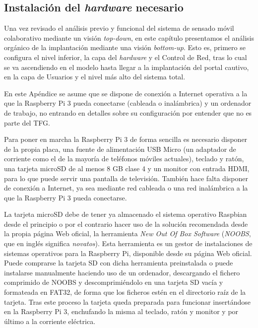 \appendixtitleon
\appendixtitletocon
\begin{appendices}
{}%
\begin{center}
\begin{minipage}{.75\textwidth}
\section{Instalación del \emph{hardware} necesario}\label{ApendiceA}


Una vez revisado el análisis previo y funcional del sistema de sensado móvil colaborativo mediante un visión \emph{top-down}, en este capítulo presentamos  el análisis orgánico de la implantación mediante una visión \emph{bottom-up}. Esto es, primero se configura el nivel inferior, la capa del \emph{hardware} y el Control de Red, tras lo cual se va ascendiendo en el modelo hasta llegar a la implantación del portal cautivo, en la capa de Usuarios y el nivel más alto del sistema total.
\end{minipage}
\end{center}
\clearpage%

En este Apéndice se asume que se dispone de conexión a Internet operativa a la que la Raspberry Pi 3 pueda conectarse (cableada o inalámbrica) y un ordenador de trabajo, no entrando en detalles sobre su configuración por entender que no es parte del TFG.

Para poner en marcha la Raspberry Pi 3 de forma sencilla es necesario disponer de la propia placa, una fuente de alimentación USB Micro (un adaptador de corriente como el de la mayoría de teléfonos móviles actuales), teclado y ratón, una tarjeta microSD de al menos 8 GB clase 4 y un monitor con entrada HDMI, para lo que puede servir una pantalla de televisión. También hace falta disponer de conexión a Internet, ya sea mediante red cableada o una red inalámbrica a la que la Raspberry Pi 3 pueda conectarse.

La tarjeta microSD debe de tener ya almacenado el sistema operativo Raspbian desde el principio o por el contrario hacer uso de la solución recomendada desde la propia página Web oficial, la herramienta \emph{New Out Of Box Software} (\emph{\acrshort{NOOBS}}, que en inglés significa \emph{novatos}). Esta herramienta es un gestor de instalaciones de sistemas operativos para la Raspberry Pi, disponible desde su página Web oficial. Puede comprarse la tarjeta SD con dicha herramienta preinstalada o puede instalarse manualmente haciendo uso de un ordenador, descargando el fichero comprimido de NOOBS y descomprimiéndolo en una tarjeta SD vacía y formateada en FAT32, de forma que los ficheros estén en el directorio raíz de la tarjeta. Tras este proceso la tarjeta queda preparada para funcionar insertándose en la Raspberry Pi 3, enchufando la misma al teclado, ratón y monitor y por último a la corriente eléctrica.


\end{appendices}
